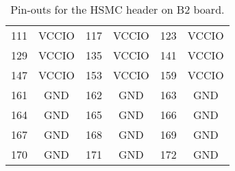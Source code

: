 \begin{table}[ht]
\begin{tabular}{|c|c||c|c||c|c|}
111 & VCCIO & 117 & VCCIO & 123 & VCCIO \\
129 & VCCIO & 135 & VCCIO & 141 & VCCIO \\
147 & VCCIO & 153 & VCCIO & 159 & VCCIO \\
161 & GND & 162 & GND & 163 & GND \\
164 & GND & 165 & GND & 166 & GND \\
167 & GND & 168 & GND & 169 & GND \\
170 & GND & 171 & GND & 172 & GND \\
\hline
\end{tabular}
\caption{Pin-outs for the HSMC header on B2 board.}
\label{tab:b2_hsmc_pinout}
\end{table}


